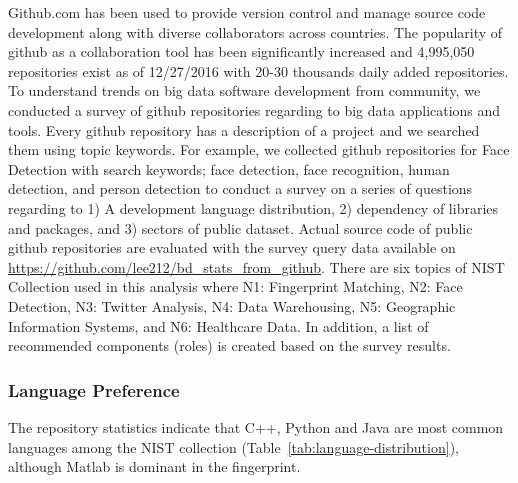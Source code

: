 \documentclass[9pt,twocolumn,twoside]{styles/osajnl}
\begin{document}
Github.com has been used to provide version control and manage source
code development along with diverse collaborators across
countries. The popularity of github as a collaboration tool has been
significantly increased and 4,995,050 repositories exist as of
12/27/2016 with 20-30 thousands daily added repositories. To
understand trends on big data software development from community, we
conducted a survey of github repositories regarding to big data
applications and tools. Every github repository has a description of a
project and we searched them using topic keywords. For example, we
collected github repositories for Face Detection with search keywords;
face detection, face recognition, human detection, and person
detection to conduct a survey on a series of questions regarding to 1)
A development language distribution, 2) dependency of libraries and
packages, and 3) sectors of public dataset. Actual source code of
public github repositories are evaluated with the survey query data
available on
\url{https://github.com/lee212/bd_stats_from_github}. There are six
topics of NIST Collection used in this analysis where N1: Fingerprint
Matching, N2: Face Detection, N3: Twitter Analysis, N4: Data
Warehousing, N5: Geographic Information Systems, and N6: Healthcare
Data. In addition, a list of recommended components (roles) is created
based on the survey results.

\subsubsection{Language Preference}

The repository statistics indicate that C++, Python and Java are most common
languages among the NIST collection (Table~\ref{tab:language-distribution}),
although Matlab is dominant in the fingerprint.
\end{document}
